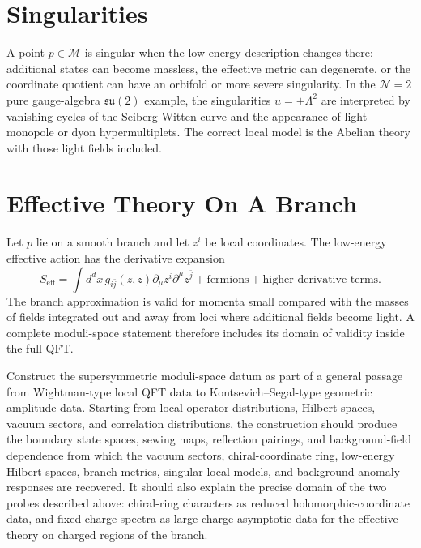 \section{Singularities}

A point \(p\in\mathcal M\) is singular when the low-energy description changes
there: additional states can become massless, the effective metric can
degenerate, or the coordinate quotient can have an orbifold or more severe
singularity.  In the \(\mathcal N=2\) pure gauge-algebra \(\mathfrak{su}(2)\)
example, the singularities \(u=\pm\Lambda^2\) are interpreted by vanishing
cycles of the Seiberg-Witten curve and the appearance of light monopole or
dyon hypermultiplets.  The correct local model is the Abelian theory with
those light fields included.

\section{Effective Theory On A Branch}

Let \(p\) lie on a smooth branch and let \(z^i\) be local coordinates.  The
low-energy effective action has the derivative expansion
\[
  S_{\mathrm{eff}}
  =
  \int d^dx\,
  g_{i\bar j}(z,\bar z)\partial_\mu z^i\partial^\mu\bar z^{\bar j}
  +\text{fermions}
  +\text{higher-derivative terms}.
\]
The branch approximation is valid for momenta small compared with the masses
of fields integrated out and away from loci where additional fields become
light.  A complete moduli-space statement therefore includes its domain of
validity inside the full QFT.

\begin{openproblem}
\label{op:susy-nonperturbative-moduli-space-construction}
Construct the supersymmetric moduli-space datum as part of a general passage
from Wightman-type local QFT data to Kontsevich--Segal-type geometric
amplitude data.  Starting from local operator distributions, Hilbert spaces,
vacuum sectors, and correlation distributions, the construction should
produce the boundary state spaces, sewing maps, reflection pairings, and
background-field dependence from which the vacuum sectors,
chiral-coordinate ring, low-energy Hilbert spaces, branch metrics, singular
local models, and background anomaly responses are recovered.  It should
also explain the precise domain of the two probes described above:
chiral-ring characters as reduced holomorphic-coordinate data, and
fixed-charge spectra as large-charge asymptotic data for the effective
theory on charged regions of the branch.
\end{openproblem}

